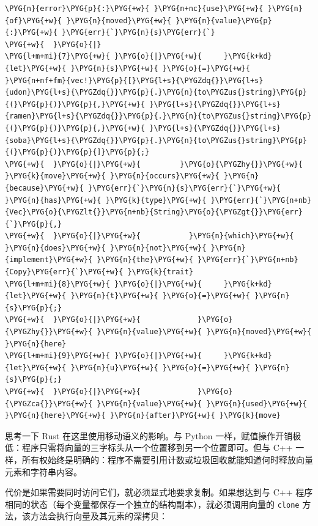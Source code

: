 \begin{Verbatim}[commandchars=\\\{\},breaklines=true,breakanywhere=true,fontsize=\codefont,xleftmargin=17bp]
\PYG{n}{error}\PYG{p}{:}\PYG{+w}{ }\PYG{n+nc}{use}\PYG{+w}{ }\PYG{n}{of}\PYG{+w}{ }\PYG{n}{moved}\PYG{+w}{ }\PYG{n}{value}\PYG{p}{:}\PYG{+w}{ }\PYG{err}{`}\PYG{n}{s}\PYG{err}{`}
\PYG{+w}{  }\PYG{o}{|}
\PYG{l+m+mi}{7}\PYG{+w}{ }\PYG{o}{|}\PYG{+w}{     }\PYG{k+kd}{let}\PYG{+w}{ }\PYG{n}{s}\PYG{+w}{ }\PYG{o}{=}\PYG{+w}{ }\PYG{n+nf+fm}{vec!}\PYG{p}{[}\PYG{l+s}{\PYGZdq{}}\PYG{l+s}{udon}\PYG{l+s}{\PYGZdq{}}\PYG{p}{.}\PYG{n}{to\PYGZus{}string}\PYG{p}{(}\PYG{p}{)}\PYG{p}{,}\PYG{+w}{ }\PYG{l+s}{\PYGZdq{}}\PYG{l+s}{ramen}\PYG{l+s}{\PYGZdq{}}\PYG{p}{.}\PYG{n}{to\PYGZus{}string}\PYG{p}{(}\PYG{p}{)}\PYG{p}{,}\PYG{+w}{ }\PYG{l+s}{\PYGZdq{}}\PYG{l+s}{soba}\PYG{l+s}{\PYGZdq{}}\PYG{p}{.}\PYG{n}{to\PYGZus{}string}\PYG{p}{(}\PYG{p}{)}\PYG{p}{]}\PYG{p}{;}
\PYG{+w}{  }\PYG{o}{|}\PYG{+w}{         }\PYG{o}{\PYGZhy{}}\PYG{+w}{ }\PYG{k}{move}\PYG{+w}{ }\PYG{n}{occurs}\PYG{+w}{ }\PYG{n}{because}\PYG{+w}{ }\PYG{err}{`}\PYG{n}{s}\PYG{err}{`}\PYG{+w}{ }\PYG{n}{has}\PYG{+w}{ }\PYG{k}{type}\PYG{+w}{ }\PYG{err}{`}\PYG{n+nb}{Vec}\PYG{o}{\PYGZlt{}}\PYG{n+nb}{String}\PYG{o}{\PYGZgt{}}\PYG{err}{`}\PYG{p}{,}
\PYG{+w}{  }\PYG{o}{|}\PYG{+w}{           }\PYG{n}{which}\PYG{+w}{ }\PYG{n}{does}\PYG{+w}{ }\PYG{n}{not}\PYG{+w}{ }\PYG{n}{implement}\PYG{+w}{ }\PYG{n}{the}\PYG{+w}{ }\PYG{err}{`}\PYG{n+nb}{Copy}\PYG{err}{`}\PYG{+w}{ }\PYG{k}{trait}
\PYG{l+m+mi}{8}\PYG{+w}{ }\PYG{o}{|}\PYG{+w}{     }\PYG{k+kd}{let}\PYG{+w}{ }\PYG{n}{t}\PYG{+w}{ }\PYG{o}{=}\PYG{+w}{ }\PYG{n}{s}\PYG{p}{;}
\PYG{+w}{  }\PYG{o}{|}\PYG{+w}{             }\PYG{o}{\PYGZhy{}}\PYG{+w}{ }\PYG{n}{value}\PYG{+w}{ }\PYG{n}{moved}\PYG{+w}{ }\PYG{n}{here}
\PYG{l+m+mi}{9}\PYG{+w}{ }\PYG{o}{|}\PYG{+w}{     }\PYG{k+kd}{let}\PYG{+w}{ }\PYG{n}{u}\PYG{+w}{ }\PYG{o}{=}\PYG{+w}{ }\PYG{n}{s}\PYG{p}{;}
\PYG{+w}{  }\PYG{o}{|}\PYG{+w}{             }\PYG{o}{\PYGZca{}}\PYG{+w}{ }\PYG{n}{value}\PYG{+w}{ }\PYG{n}{used}\PYG{+w}{ }\PYG{n}{here}\PYG{+w}{ }\PYG{n}{after}\PYG{+w}{ }\PYG{k}{move}
\end{Verbatim}

思考一下 Rust 在这里使用移动语义的影响。与 Python 一样，赋值操作开销极低：程序只需将向量的三字标头从一个位置移到另一个位置即可。但与 C++ 一样，所有权始终是明确的：程序不需要引用计数或垃圾回收就能知道何时释放向量元素和字符串内容。

代价是如果需要同时访问它们，就必须显式地要求复制。如果想达到与 C++ 程序相同的状态（每个变量都保存一个独立的结构副本），就必须调用向量的 \texttt{clone} 方法，该方法会执行向量及其元素的深拷贝：

